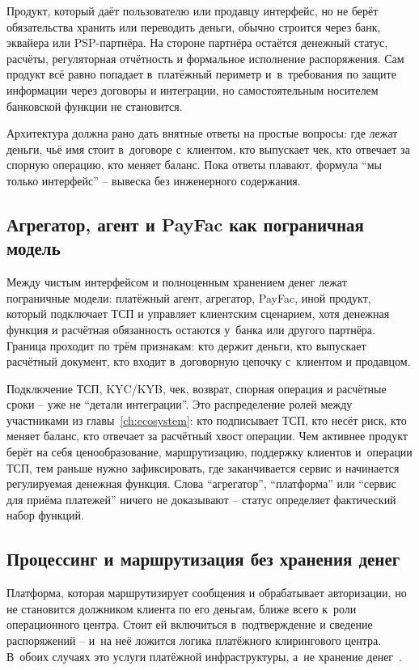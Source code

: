 Продукт, который даёт пользователю или продавцу интерфейс, но не берёт обязательства хранить или переводить деньги, обычно строится через банк, эквайера или PSP-партнёра. На стороне партнёра остаётся денежный статус, расчёты, регуляторная отчётность и формальное исполнение распоряжения.
Сам продукт всё равно попадает в~платёжный периметр и~в~требования по защите информации через договоры и интеграции, но самостоятельным носителем банковской функции не становится.

Архитектура должна рано дать внятные ответы на простые вопросы: где лежат деньги, чьё имя стоит в~договоре с~клиентом, кто выпускает чек, кто отвечает за спорную операцию, кто меняет баланс. Пока ответы плавают, формула \enquote{мы только интерфейс} -- вывеска без инженерного содержания.

\subsection*{Агрегатор, агент и PayFac как пограничная модель}

Между чистым интерфейсом и полноценным хранением денег лежат пограничные модели: платёжный агент, агрегатор, PayFac, иной продукт, который подключает ТСП и управляет клиентским сценарием, хотя денежная функция и расчётная обязанность остаются у~банка или другого партнёра.
Граница проходит по трём признакам: кто держит деньги, кто выпускает расчётный документ, кто входит в~договорную цепочку с~клиентом и продавцом.

Подключение ТСП, KYC/KYB, чек, возврат, спорная операция и расчётные сроки -- уже не \enquote{детали интеграции}. Это распределение ролей между участниками из главы~\ref{ch:ecosystem}: кто подписывает ТСП, кто несёт риск, кто меняет баланс, кто отвечает за расчётный хвост операции.
Чем активнее продукт берёт на себя ценообразование, маршрутизацию, поддержку клиентов и~операции ТСП, тем раньше нужно зафиксировать, где заканчивается сервис и начинается регулируемая денежная функция. Слова \enquote{агрегатор}, \enquote{платформа} или \enquote{сервис для приёма платежей} ничего не доказывают -- статус определяет фактический набор функций.

\subsection*{Процессинг и маршрутизация без хранения денег}

Платформа, которая маршрутизирует сообщения и обрабатывает авторизации, но не становится должником клиента по его деньгам, ближе всего к~роли операционного центра. Стоит ей включиться в~подтверждение и сведение распоряжений -- и~на неё ложится логика платёжного клирингового центра. В~обоих случаях это услуги платёжной инфраструктуры, а~не хранение денег~\cite{fz-161}.

